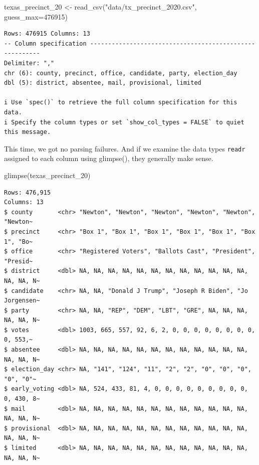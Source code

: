 \documentclass[
  letterpaper,
  DIV=11,
  numbers=noendperiod]{scrreprt}
\newenvironment{Shaded}{\begin{snugshade}}{\end{snugshade}}
\newcommand{\AttributeTok}[1]{\textcolor[rgb]{0.40,0.45,0.13}{#1}}
\newcommand{\DecValTok}[1]{\textcolor[rgb]{0.68,0.00,0.00}{#1}}
\newcommand{\FunctionTok}[1]{\textcolor[rgb]{0.28,0.35,0.67}{#1}}
\newcommand{\NormalTok}[1]{\textcolor[rgb]{0.00,0.23,0.31}{#1}}
\newcommand{\OtherTok}[1]{\textcolor[rgb]{0.00,0.23,0.31}{#1}}
\newcommand{\StringTok}[1]{\textcolor[rgb]{0.13,0.47,0.30}{#1}}
\begin{document}
\begin{Shaded}
\begin{Highlighting}[]
\NormalTok{texas\_precinct\_20 }\OtherTok{\textless{}{-}} \FunctionTok{read\_csv}\NormalTok{(}\StringTok{"data/tx\_precinct\_2020.csv"}\NormalTok{, }\AttributeTok{guess\_max=}\DecValTok{476915}\NormalTok{)}
\end{Highlighting}
\end{Shaded}

\begin{verbatim}
Rows: 476915 Columns: 13
-- Column specification --------------------------------------------------------
Delimiter: ","
chr (6): county, precinct, office, candidate, party, election_day
dbl (5): district, absentee, mail, provisional, limited

i Use `spec()` to retrieve the full column specification for this data.
i Specify the column types or set `show_col_types = FALSE` to quiet this message.
\end{verbatim}

This time, we got no parsing failures. And if we examine the data types
\texttt{readr} assigned to each column using glimpse(), they generally
make sense.

\begin{Shaded}
\begin{Highlighting}[]
\FunctionTok{glimpse}\NormalTok{(texas\_precinct\_20)}
\end{Highlighting}
\end{Shaded}

\begin{verbatim}
Rows: 476,915
Columns: 13
$ county       <chr> "Newton", "Newton", "Newton", "Newton", "Newton", "Newton~
$ precinct     <chr> "Box 1", "Box 1", "Box 1", "Box 1", "Box 1", "Box 1", "Bo~
$ office       <chr> "Registered Voters", "Ballots Cast", "President", "Presid~
$ district     <dbl> NA, NA, NA, NA, NA, NA, NA, NA, NA, NA, NA, NA, NA, NA, N~
$ candidate    <chr> NA, NA, "Donald J Trump", "Joseph R Biden", "Jo Jorgensen~
$ party        <chr> NA, NA, "REP", "DEM", "LBT", "GRE", NA, NA, NA, NA, NA, N~
$ votes        <dbl> 1003, 665, 557, 92, 6, 2, 0, 0, 0, 0, 0, 0, 0, 0, 0, 553,~
$ absentee     <dbl> NA, NA, NA, NA, NA, NA, NA, NA, NA, NA, NA, NA, NA, NA, N~
$ election_day <chr> NA, "141", "124", "11", "2", "2", "0", "0", "0", "0", "0"~
$ early_voting <dbl> NA, 524, 433, 81, 4, 0, 0, 0, 0, 0, 0, 0, 0, 0, 0, 430, 8~
$ mail         <dbl> NA, NA, NA, NA, NA, NA, NA, NA, NA, NA, NA, NA, NA, NA, N~
$ provisional  <dbl> NA, NA, NA, NA, NA, NA, NA, NA, NA, NA, NA, NA, NA, NA, N~
$ limited      <dbl> NA, NA, NA, NA, NA, NA, NA, NA, NA, NA, NA, NA, NA, NA, N~
\end{verbatim}
\end{document}
